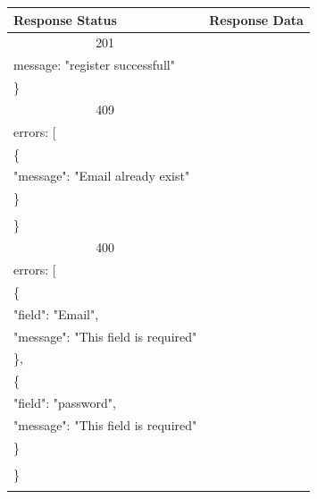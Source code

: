\documentclass[12pt,oneside,openright,a4paper]{cpe-thai-project}
\begin{document}
\begin{itemize}
\begin{longtable}[!ht]{p{3cm}|p{8cm}}
  \textbf{Response Status}  & \multicolumn{1}{c}{\textbf{Response Data}}                                                                          \\ \hline
  \multicolumn{1}{c|}{201}  & \begin{tabular}[c]{@{}l@{}}\{\\ \quad message: "register successfull"\\ \}\end{tabular}                                 \\ \hline
  \multicolumn{1}{c|}{409}  &
  \begin{tabular}[c]{@{}l@{}}\{\\ \quad errors: {[}\\ \quad\quad\{\\ \quad\quad\quad "message": "Email already exist"\\ \quad\quad \}\\ \quad{]}\\\}\end{tabular} \\ \hline
  \multicolumn{1}{c|}{400}  &
  \begin{tabular}[c]{@{}l@{}}\{\\ \quad errors: {[}\\ \quad\quad\{\\ \quad\quad\quad "field": "Email",\\ \quad\quad\quad"message": "This field is required"\\ \quad\quad\},\\ 
    \quad\quad\{\\ \quad\quad\quad"field": "password",\\ \quad\quad\quad "message": "This field is required"\\ \quad\quad \}\\\quad {]}\\ \}\end{tabular}                                                                         \\ \hline
  \hhline{==}
\end{longtable}


\end{itemize}
\end{document}
